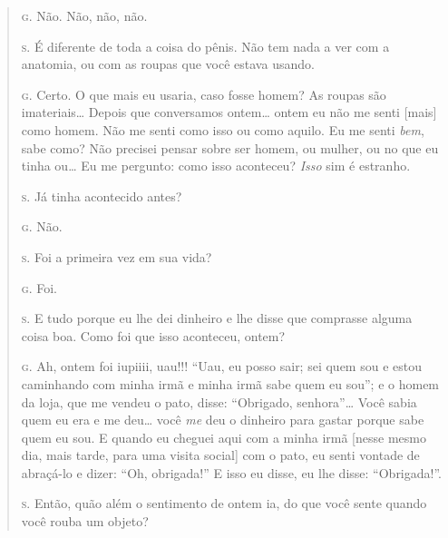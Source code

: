 \begin{quote}
\noindent\hskip0mm\textsc{g.} Não. Não, não, não.

\noindent\hskip0mm\textsc{s.} É diferente de toda a coisa do pênis. Não tem nada a ver com a
anatomia, ou com as roupas que você estava usando.

\noindent\hskip0mm\textsc{g.} Certo. O que mais eu usaria, caso fosse homem? As roupas são
imateriais\ldots{} Depois que conversamos ontem\ldots{} ontem eu não me senti
[mais] como homem. Não me senti como isso ou como aquilo. Eu me senti
\textit{bem}, sabe como? Não precisei pensar sobre ser homem, ou
mulher, ou no que eu tinha ou\ldots{} Eu me pergunto: como isso aconteceu?
\textit{Isso} sim é estranho.

\noindent\hskip0mm\textsc{s.} Já tinha acontecido antes?

\noindent\hskip0mm\textsc{g.} Não.

\noindent\hskip0mm\textsc{s.} Foi a primeira vez em sua vida?

\noindent\hskip0mm\textsc{g.} Foi.

\noindent\hskip0mm\textsc{s.} E tudo porque eu lhe dei dinheiro e lhe disse que comprasse alguma
coisa boa. Como foi que isso aconteceu, ontem?

\noindent\hskip0mm\textsc{g.} Ah, ontem foi iupiiii, uau!!! ``Uau, eu posso sair; sei
quem sou e estou caminhando com minha irmã e minha irmã sabe quem eu
sou''; e o homem da loja, que me vendeu o pato, disse:
``Obrigado, senhora''\ldots{} Você sabia quem eu
era e me deu\ldots{} você \textit{me} deu o dinheiro para gastar porque sabe
quem eu sou. E quando eu cheguei aqui com a minha irmã [nesse mesmo
dia, mais tarde, para uma visita social] com o pato, eu senti vontade
de abraçá-lo e dizer: ``Oh, obrigada!'' E
isso eu disse, eu lhe disse: ``Obrigada!''.

\noindent\hskip0mm\textsc{s.} Então, quão além o sentimento de ontem ia, do que você sente quando
você rouba um objeto?


\end{quote}
